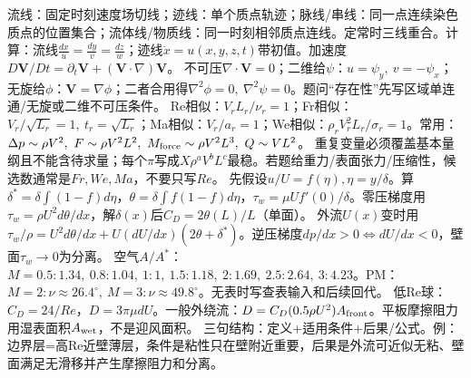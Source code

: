 流线：固定时刻速度场切线；迹线：单个质点轨迹；脉线/串线：同一点连续染色质点的位置集合；流体线/物质线：同一时刻相邻质点连线。定常时三线重合。计算：流线$\frac{dx}{u}=\frac{dy}{v}=\frac{dz}{w}$；迹线$\dot x=u(x,y,z,t)$带初值。加速度$D\bm V/Dt=\partial_t\bm V+(\bm V\cdot\nabla)\bm V$。
不可压$\nabla\cdot\bm V=0$；二维给$\psi$：$u=\psi_y,\ v=-\psi_x$；无旋给$\phi$：$\bm V=\nabla\phi$；二者合用得$\nabla^2\phi=0,\ \nabla^2\psi=0$。题问“存在性”先写区域单连通/无旋或二维不可压条件。
Re相似：$V_rL_r/\nu_r=1$；Fr相似：$V_r/\sqrt{L_r}=1,\ t_r=\sqrt{L_r}$；Ma相似：$V_r/a_r=1$；We相似：$\rho_rV_r^2L_r/\sigma_r=1$。常用：$\Delta p\sim\rho V^2,\ F\sim\rho V^2L^2,\ M_{\rm force}\sim\rho V^2L^3,\ Q\sim VL^2$。
重复变量必须覆盖基本量纲且不能含待求量；每个$\pi$写成$X\rho^aV^bL^c$最稳。若题给重力/表面张力/压缩性，候选数通常是$Fr,We,Ma$，不要只写$Re$。
先假设$u/U=f(\eta),\eta=y/\delta$。算$\delta^*=\delta\int(1-f)d\eta$，$\theta=\delta\int f(1-f)d\eta$，$\tau_w=\mu U f'(0)/\delta$。零压梯度用$\tau_w=\rho U^2d\theta/dx$，解$\delta(x)$后$C_D=2\theta(L)/L$（单面）。
外流$U(x)$变时用$\tau_w/\rho=U^2d\theta/dx+U(dU/dx)(2\theta+\delta^*)$。逆压梯度$dp/dx>0\Leftrightarrow dU/dx<0$，壁面$\tau_w\to0$为分离。
空气$A/A^*$：$M=0.5:1.34,\ 0.8:1.04,\ 1:1,\ 1.5:1.18,\ 2:1.69,\ 2.5:2.64,\ 3:4.23$。PM：$M=2:\nu\approx26.4^\circ,\ M=3:\nu\approx49.8^\circ$。无表时写查表输入和后续回代。
低Re球：$C_D=24/Re$，$D=3\pi\mu dU$。一般外绕流：$D=C_D(0.5\rho U^2)A_{\rm front}$。平板摩擦阻力用湿表面积$A_{\rm wet}$，不是迎风面积。
三句结构：定义+适用条件+后果/公式。例：边界层=高Re近壁薄层，条件是粘性只在壁附近重要，后果是外流可近似无粘、壁面满足无滑移并产生摩擦阻力和分离。


